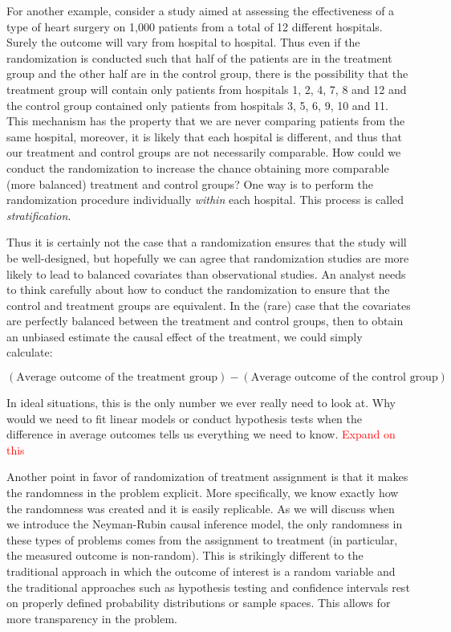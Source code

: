 For another example, consider a study aimed at assessing the effectiveness of a type of heart surgery on 1,000 patients from a total of 12 different hospitals. Surely the outcome will vary from hospital to hospital. Thus even if the randomization is conducted such that half of the patients are in the treatment group and the other half are in the control group, there is the possibility that the treatment group will contain only patients from hospitals 1, 2, 4, 7, 8 and 12 and the control group contained only patients from hospitals 3, 5, 6, 9, 10 and 11. This mechanism has the property that we are never comparing patients from the same hospital, moreover, it is likely that each hospital is different, and thus that our treatment and control groups are not necessarily comparable. How could we conduct the randomization to increase the chance obtaining more comparable (more balanced) treatment and control groups? One way is to perform the randomization procedure individually \emph{within} each hospital. This process is called \emph{stratification}.

Thus it is certainly not the case that a randomization ensures that the study will be well-designed, but hopefully we can agree that randomization studies are more likely to lead to balanced covariates than observational studies. An analyst needs to think carefully about how to conduct the randomization to ensure that the control and treatment groups are equivalent. In the (rare) case that the covariates are perfectly balanced between the treatment and control groups, then to obtain an unbiased estimate the causal effect of the treatment, we could simply calculate:

$$(\textrm{Average outcome of the treatment group}) - (\textrm{Average outcome of the control group})$$

In ideal situations, this is the only number we ever really need to look at. Why would we need to fit linear models or conduct hypothesis tests when the difference in average outcomes tells us everything we need to know. \textcolor{red}{Expand on this}

Another point in favor of randomization of treatment assignment is that it makes the randomness in the problem explicit. More specifically, we know exactly how the randomness was created and it is easily replicable. As we will discuss when we introduce the Neyman-Rubin causal inference model, the only randomness in these types of problems comes from the assignment to treatment (in particular, the measured outcome is non-random). This is strikingly different to the traditional approach in which the outcome of interest is a random variable and the traditional approaches such as hypothesis testing and confidence intervals rest on properly defined probability distributions or sample spaces. This allows for more transparency in the problem.


